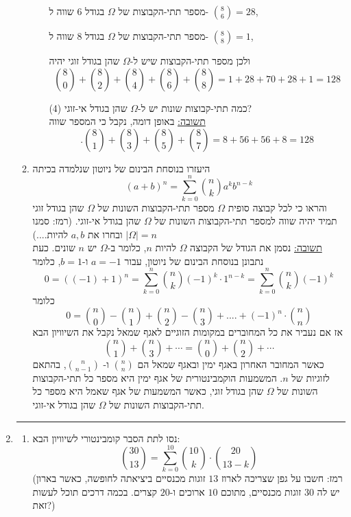 \documentclass[12pt, a4paper]{article}
\begin{document}
\begin{enumerate}
\begin{enumerate}
\begin{enumerate}
מספר תתי-הקבוצות של
$\Omega$
בגודל 
$6$
שווה ל-
$\binom{8}{6}=28$,

מספר תתי-הקבוצות של
$\Omega$
בגודל 
$8$
שווה ל-
$\binom{8}{8}=1$,

ולכן מספר תתי-הקבוצות שיש ל-$\Omega$
שהן בגודל זוגי יהיה 
$$\boxed{\binom{8}{0}+\binom{8}{2}+\binom{8}{4}+\binom{8}{6}+\binom{8}{8}
=1+28+70+28+1=128}
$$
\item[(4)]
כמה תתי-קבוצות שונות יש ל-$\Omega$
שהן בגודל אי-זוגי?
\\

\underline{תשובה:}
באופן דומה, נקבל כי המספר שווה
$$\boxed{.\binom{8}{1}+\binom{8}{3}+\binom{8}{5}+\binom{8}{7}=
8+56+56+8=128}$$
\end{enumerate}
\item
היעזרו בנוסחת הבינום של ניוטון שנלמדה בכיתה
$$(a+b)^n=
\sum_{k=0}^{n}
\binom{n}{k}a^kb^{n-k}$$
והראו כי לכל קבוצה סופית
$\Omega$
מספר תתי-הקבוצות השונות
של
$\Omega$
שהן בגודל זוגי תמיד יהיה שווה למספר תתי-הקבוצות השונות 
של
$\Omega$
שהן בגודל אי-זוגי.
(רמז: סמנו
$|\Omega|=n$
ובחרו את
$a,b$ 
להיות....)
\\

\underline{תשובה:}
נסמן את הגודל של הקבוצה
$\Omega$
להיות
$n$,
כלומר ב-$\Omega$
יש
$n$
שונים.
כעת נתבונן בנוסחת הבינום של ניוטון, עבור
$a=-1$
ו-$b=1$,
כלומר
$$0=((-1)+1)^n=
\sum_{k=0}^{n}
\binom{n}{k}(-1)^k\cdot 1^{n-k}=
\sum_{k=0}^n
\binom{n}{k}(-1)^k$$
כלומר
$$0=\binom{n}{0}-\binom{n}{1}+\binom{n}{2}-\binom{n}{3}+....+(-1)^n\cdot\binom{n}{n}$$
אז אם נעביר את כל המחוברים במקומות הזוגיים לאגף שמאל נקבל את השיוויון הבא
$$\boxed{\binom{n}{1}+\binom{n}{3}+\cdots = \binom{n}{0}+\binom{n}{2}+\cdots}$$
כאשר המחובר האחרון באגף ימין ובאגף שמאל הם
$\binom{n}{n}$
ו-
$\binom{n}{n-1}$,
בהתאם לזוגיות של
$n$.
המשמעות הוקמבינטורית של אגף ימין היא מספר כל תתי-הקבוצות השונות של
$\Omega$
 שהן בגודל זוגי, כאשר המשמעות של אגף שאמל היא מספר כל תתי-הקבוצות השונות של
 $\Omega$
 שהן בגודל אי-זוגי.
\end{enumerate}

\noindent\rule{15cm}{0.4pt}

\item
\begin{enumerate}
\item
נסו לתת הסבר קומבינטורי לשיוויון הבא:
$$\binom{30}{13}
=\sum_{k=0}^{10}
\binom{10}{k}\cdot \binom{20}{13-k}$$
(רמז:
חשבו על
גפן שצריכה לארוז 
$13$
זוגות מכנסיים 
ביציאתה לחופשה, כאשר בארון יש לה
$30$
זוגות מכנסיים, מתוכם 
$10$
ארוכים
ו-$20$
קצרים. בכמה דרכים תוכל לעשות זאת?)
\\


\end{enumerate}
\end{enumerate}
\end{document}
